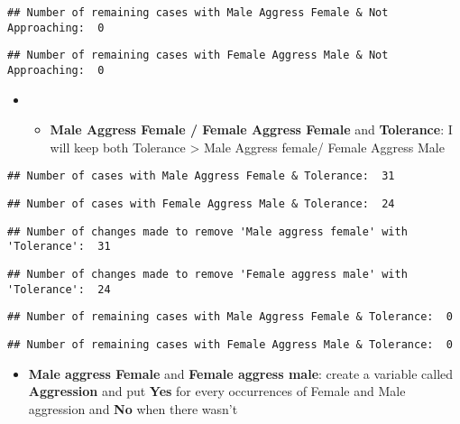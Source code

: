 \documentclass[
]{article}
\providecommand{\tightlist}{%
  \setlength{\itemsep}{0pt}\setlength{\parskip}{0pt}}
\begin{document}
\begin{verbatim}
## Number of remaining cases with Male Aggress Female & Not Approaching:  0
\end{verbatim}

\begin{verbatim}
## Number of remaining cases with Female Aggress Male & Not Approaching:  0
\end{verbatim}

\begin{itemize}
\item
  \begin{itemize}
  \tightlist
  \item
    \textbf{Male Aggress Female / Female Aggress Female} and
    \textbf{Tolerance}: I will keep both Tolerance \textgreater{} Male
    Aggress female/ Female Aggress Male
  \end{itemize}
\end{itemize}

\begin{verbatim}
## Number of cases with Male Aggress Female & Tolerance:  31
\end{verbatim}

\begin{verbatim}
## Number of cases with Female Aggress Male & Tolerance:  24
\end{verbatim}

\begin{verbatim}
## Number of changes made to remove 'Male aggress female' with 'Tolerance':  31
\end{verbatim}

\begin{verbatim}
## Number of changes made to remove 'Female aggress male' with 'Tolerance':  24
\end{verbatim}

\begin{verbatim}
## Number of remaining cases with Male Aggress Female & Tolerance:  0
\end{verbatim}

\begin{verbatim}
## Number of remaining cases with Female Aggress Male & Tolerance:  0
\end{verbatim}

\begin{itemize}
\tightlist
\item
  \textbf{Male aggress Female} and \textbf{Female aggress male}: create
  a variable called \textbf{Aggression} and put \textbf{Yes} for every
  occurrences of Female and Male aggression and \textbf{No} when there
  wasn't
\end{itemize}
\end{document}
